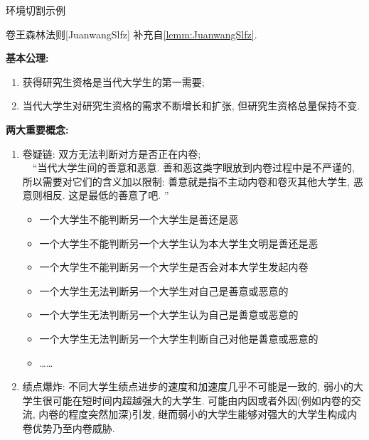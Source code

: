 \documentclass[hyperref, UTF8, CJK, aspectratio=169]{beamer}
\begin{document}
\begin{frame}[t,allowframebreaks]{环境切割示例}
	\begin{scuremark}{卷王森林法则}[JuanwangSlfz]
		补充自\vref{lemm:JuanwangSlfz}.\par
		\textbf{\color{scured}基本公理:}
		\begin{enumerate}
			\item 获得研究生资格是当代大学生的第一需要;
			\item 当代大学生对研究生资格的需求不断增长和扩张, 但研究生资格总量保持不变.
		\end{enumerate}
		\textbf{\color{scured}两大重要概念:}
		\begin{enumerate}
			\item 卷疑链: 双方无法判断对方是否正在内卷;\\
			~~“当代大学生间的善意和恶意. 善和恶这类字眼放到内卷过程中是不严谨的, 所以需要对它们的含义加以限制: 善意就是指不主动内卷和卷灭其他大学生, 恶意则相反. 这是最低的善意了吧. ”
			\begin{itemize}
				\item 一个大学生不能判断另一个大学生是善还是恶
				\item 一个大学生不能判断另一个大学生认为本大学生文明是善还是恶
				\item 一个大学生不能判断另一个大学生是否会对本大学生发起内卷
				\item 一个大学生无法判断另一个大学生对自己是善意或恶意的
				\item 一个大学生无法判断另一个大学生认为自己是善意或恶意的
				\item 一个大学生无法判断另一个大学生判断自己对他是善意或恶意的
				\item \dots\dots
			\end{itemize}	
			\item 绩点爆炸: 不同大学生绩点进步的速度和加速度几乎不可能是一致的, 弱小的大学生很可能在短时间内超越强大的大学生. 可能由内因或者外因(例如内卷的交流, 内卷的程度突然加深)引发, 继而弱小的大学生能够对强大的大学生构成内卷优势乃至内卷威胁.
		\end{enumerate}
	\end{scuremark}
\end{frame}
\end{document}
